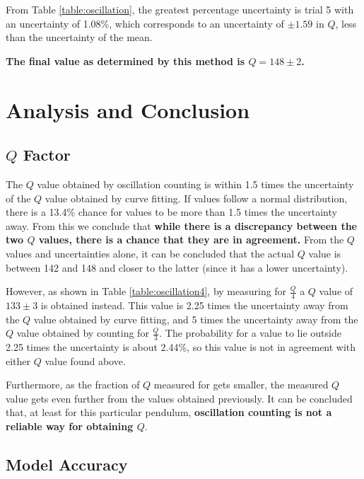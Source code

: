 \documentclass[aps,twocolumn,secnumarabic,nobalancelastpage,amsmath,amssymb,nofootinbib,letterpaper]{revtex4}
\begin{document}
From Table \ref{table:oscillation}, the greatest percentage uncertainty is trial 5 with an uncertainty of 1.08\%, which
corresponds to an uncertainty of \(\pm 1.59\) in \(Q\), less than the uncertainty of the mean.

\textbf{The final value as determined by this method is \(Q = 148 \pm 2\).}


\section{Analysis and Conclusion}
\label{section:analysis}

\subsection{\texorpdfstring{\(Q\)}{Q} Factor}

The \(Q\) value obtained by oscillation counting is within 1.5 times the uncertainty of the \(Q\) value obtained by
curve fitting. If values follow a normal distribution, there is a 13.4\% chance for values to be more than 1.5 times the
uncertainty away. From this we conclude that \textbf{while there is a discrepancy between the two \(Q\) values, there is
a chance that they are in agreement.} From the \(Q\) values and uncertainties alone, it can be concluded that the actual
\(Q\) value is between 142 and 148 and closer to the latter (since it has a lower uncertainty).

However, as shown in Table \ref{table:oscillation4}, by measuring for \(\frac{Q}{4}\) a \(Q\) value of \(133 \pm 3\) is
obtained instead. This value is 2.25 times the uncertainty away from the \(Q\) value obtained by curve fitting, and 5
times the uncertainty away from the \(Q\) value obtained by counting for \(\frac{Q}{3}\). The probability for a value to
lie outside 2.25 times the uncertainty is about 2.44\%, so this value is not in agreement with either \(Q\) value found
above.

Furthermore, as the fraction of \(Q\) measured for gets smaller, the measured \(Q\) value gets even further from the
values obtained previously. It can be concluded that, at least for this particular pendulum, \textbf{oscillation
counting is not a reliable way for obtaining \(Q\)}.

\subsection{Model Accuracy}
\end{document}
